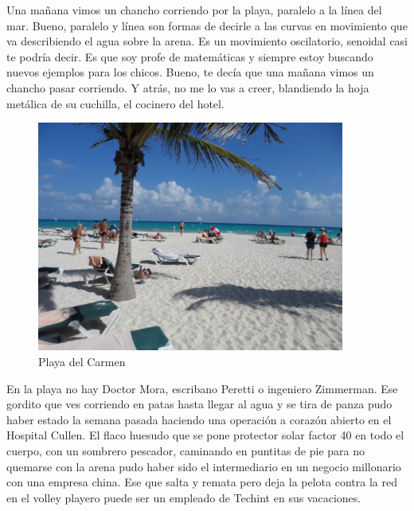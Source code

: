 \documentclass[12pt,twoside,openright,a5paper]{book}
\begin{document}
\vspace{0.5cm}
\hrulefill\hspace{0.2cm} \decofourleft\decofourright \hspace{0.2cm} \hrulefill
\vspace{0.5cm}

Una mañana vimos un chancho corriendo por la playa, paralelo a la línea del
mar. Bueno, paralelo y línea son formas de decirle a las curvas en movimiento
que va describiendo el agua sobre la arena. Es un movimiento oscilatorio,
senoidal casi te podría decir. Es que soy profe de matemáticas y siempre
estoy buscando nuevos ejemplos para los chicos. Bueno, te decía que una
mañana vimos un chancho pasar corriendo. Y atrás, no me lo vas a creer,
blandiendo la hoja metálica de su cuchilla, el cocinero del hotel.


\vspace{0.5cm}
\hrulefill\hspace{0.2cm} \decofourleft\decofourright \hspace{0.2cm} \hrulefill
\vspace{0.5cm}

\begin{figure}[H]
  \centering
    \includegraphics[width=0.9\textwidth]{fotos/2012/playaDelCarmen}
  \caption{Playa del Carmen}
  \label{Playa del Carmen}
\end{figure}

En la playa no hay Doctor Mora, escribano Peretti
o ingeniero Zimmerman. Ese gordito que ves corriendo en patas hasta llegar
al agua y se tira de panza pudo haber estado la semana pasada haciendo una
operación a corazón abierto en el Hospital Cullen. El flaco huesudo que se
pone protector solar factor 40 en todo el cuerpo, con un sombrero pescador,
caminando en puntitas de pie para no quemarse con la arena pudo haber sido
el intermediario en un negocio millonario con una empresa china. Ese que
salta y remata pero deja la pelota contra la red en el volley playero puede
ser un empleado de Techint en sus vacaciones.
\end{document}

